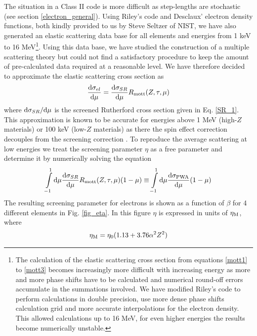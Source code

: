 The situation in a Class II code is more difficult as step-lengths
are stochastic (see section \ref{electron_general}).
Using Riley's code and Desclaux' electron
density functions, both kindly provided to us by Steve Seltzer of NIST,
we have also generated an elastic scattering data
base for all elements and energies from 1 keV to 16 MeV\footnote{
The calculation of the elastic scattering cross section from
equations \eqref{mott1} to \eqref{mott3} becomes increasingly
more difficult with increasing energy as more and more phase
shifts have to be calculated and numerical round-off errors
accumulate in the summations involved. We have modified Riley's
code to perform calculations in double precision, use more dense phase
shifts calculation grid and more accurate interpolations for
the electron density. This allowed calculations up to 16 MeV, for
even higher energies the results become numerically unstable.}.
Using this data base, we have studied the construction of a multiple
scattering theory but could not find a satisfactory procedure
to keep the amount of pre-calculated data required at a reasonable level.
We have therefore decided to approximate the elastic scattering
cross section as
\begin{equation}
\label{sigma_el}
{{\rm d}\sigma_{el} \over {\rm d}\mu} = {{\rm d}\sigma_{SR} \over {\rm d}\mu}
R_{\rm mott}(Z,\tau,\mu)
\end{equation}
where ${\rm d}\sigma_{SR}/{\rm d}\mu$ is the screened Rutherford cross
section given in Eq. \eqref{SR_1}. This approximation is known
to be accurate for energies above 1 MeV (high-$Z$ materials) or
100 keV (low-$Z$ materials) as there the spin effect correction
decouples from the screening correction \cite{BW89}. To
reproduce the average scattering at low energies we treat
the screening parameter $\eta$ as a free parameter and determine
it by numerically solving the equation
\begin{equation}
\label{fix_eta}
\int\limits_{-1}^1 {\rm d} \mu {{\rm d}\sigma_{SR} \over {\rm d}\mu}
R_{\rm mott}(Z,\tau,\mu) (1 - \mu) \equiv
\int\limits_{-1}^1 {\rm d} \mu {{\rm d}\sigma_{\rm PWA} \over {\rm d} \mu}
(1 - \mu)
\end{equation}
The resulting screening parameter for electrons is shown
as a function of $\beta$ for 4 different elements in
Fig. \ref{fig_eta}. In this figure $\eta$ is expressed in units
of $\eta_{\rm M}$, where
\begin{equation}
\label{eta_M}
\eta_{\rm M} = \eta_0 (1.13 + 3.76 \alpha^2 Z^2)
\end{equation}
